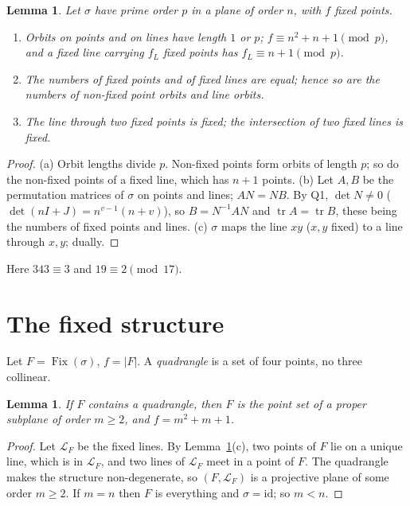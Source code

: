 \documentclass[11pt,a4paper]{article}
\newtheorem{lemma}[theorem]{Lemma}
\theoremstyle{definition}
\newcommand{\Fix}{\operatorname{Fix}}
\begin{document}
\begin{lemma}\label{lem:orbits}
Let $\sigma$ have prime order $p$ in a plane of order $n$, with $f$ fixed points.
\begin{enumerate}[label=(\alph*),itemsep=0pt]
\item Orbits on points and on lines have length $1$ or $p$; $f\equiv n^2+n+1\pmod p$, and a fixed line carrying $f_L$ fixed points has $f_L\equiv n+1\pmod p$.
\item The numbers of fixed points and of fixed lines are equal; hence so are the numbers of non-fixed point orbits and line orbits.
\item The line through two fixed points is fixed; the intersection of two fixed lines is fixed.
\end{enumerate}
\end{lemma}
\begin{proof}
(a) Orbit lengths divide $p$. Non-fixed points form orbits of length $p$; so do the non-fixed points of a fixed line, which has $n+1$ points.
(b) Let $A,B$ be the permutation matrices of $\sigma$ on points and lines; $AN=NB$. By Q1, $\det N\ne0$ ($\det(nI+J)=n^{v-1}(n+v)$), so $B=N^{-1}AN$ and $\operatorname{tr}A=\operatorname{tr}B$, these being the numbers of fixed points and lines.
(c) $\sigma$ maps the line $xy$ ($x,y$ fixed) to a line through $x,y$; dually.
\end{proof}
Here $343\equiv3$ and $19\equiv2\pmod{17}$.

\section{The fixed structure}\label{sec:fixed}

Let $F=\Fix(\sigma)$, $f=|F|$. A \emph{quadrangle} is a set of four points, no three collinear.

\begin{lemma}\label{lem:quad}
If $F$ contains a quadrangle, then $F$ is the point set of a proper subplane of order $m\ge2$, and $f=m^2+m+1$.
\end{lemma}
\begin{proof}
Let $\mathcal L_F$ be the fixed lines. By Lemma~\ref{lem:orbits}(c), two points of $F$ lie on a unique line, which is in $\mathcal L_F$, and two lines of $\mathcal L_F$ meet in a point of $F$. The quadrangle makes the structure non-degenerate, so $(F,\mathcal L_F)$ is a projective plane of some order $m\ge2$. If $m=n$ then $F$ is everything and $\sigma=\mathrm{id}$; so $m<n$.
\end{proof}
\end{document}
